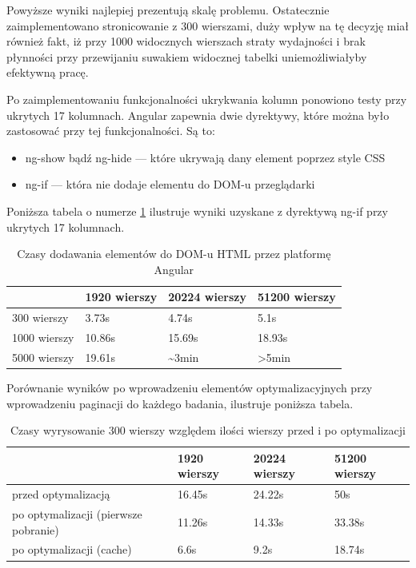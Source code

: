 \documentclass[a4paper,12pt,twoside]{article}
\begin{document}
Powyższe wyniki najlepiej prezentują skalę problemu. Ostatecznie zaimplementowano
stronicowanie z 300 wierszami, duży wpływ na tę decyzję miał również fakt, iż
przy 1000 widocznych wierszach straty wydajności i brak płynności przy przewijaniu
suwakiem widocznej tabelki uniemożliwiałyby efektywną pracę.

Po zaimplementowaniu funkcjonalności ukrykwania kolumn ponowiono testy przy ukrytych 17 kolumnach. Angular zapewnia dwie dyrektywy, które można było zastosować przy tej funkcjonalności. Są to:
\begin{itemize}
\item ng-show bądź ng-hide — które ukrywają dany element poprzez style CSS
\item ng-if — która nie dodaje elementu do DOM-u przeglądarki
\end{itemize}

Poniższa tabela o numerze \ref{table:tableRenderNgIf} ilustruje wyniki uzyskane z dyrektywą ng-if przy ukrytych 17 kolumnach.
\begin{table} [H]
\begin{tabular}{| p{3cm} | p{3cm} | p{3cm} | p{3cm}|}
\hline
& 1920 wierszy & 20224 wierszy & 51200 wierszy\\
\hline
300 wierszy& 3.73s& 4.74s& 5.1s\\ \hline
1000 wierszy& 10.86s & 15.69s& 18.93s\\ \hline
5000 wierszy& 19.61s& \textasciitilde 3min& >5min\\ \hline
\end{tabular}
\caption{Czasy dodawania elementów do DOM-u HTML przez platformę Angular}
\label{table:tableRenderNgIf}
\end{table}

Porównanie wyników po wprowadzeniu elementów optymalizacyjnych przy
wprowadzeniu paginacji do każdego badania, ilustruje poniższa
tabela.

\begin{table} [H]
\begin{tabular}{| p{3cm} | p{3cm} | p{3cm} | p{3cm}|}
\hline
& 1920 wierszy & 20224 wierszy & 51200 wierszy\\
\hline
przed optymalizacją& 16.45s& 24.22s& 50s\\ \hline
po optymalizacji (pierwsze pobranie)& 11.26s & 14.33s& 33.38s\\ \hline
po optymalizacji (cache)& 6.6s& 9.2s& 18.74s\\ \hline
\end{tabular}
\caption{Czasy wyrysowanie 300 wierszy względem ilości wierszy przed i po optymalizacji}
\label{table:summaryRender}
\end{table}
\end{document}
